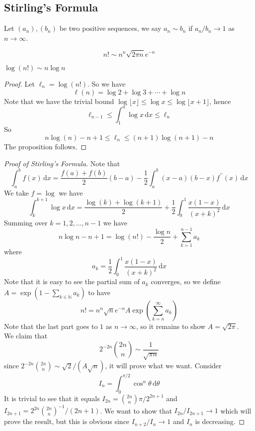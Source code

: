 \subsection{Stirling's Formula}
\begin{definition}
    Let $(a_n),(b_n)$ be two positive sequences, we say $a_n\sim b_n$ if $a_n/b_n\to 1$ as $n\to\infty$.
\end{definition}
\begin{theorem}[Stirling]
    $$n!\sim n^n\sqrt{2\pi n}e^{-n}$$
\end{theorem}
\begin{proposition}
    $\log(n!)\sim n\log n$
\end{proposition}
\begin{proof}
    Let $\ell_n=\log(n!)$.
    So we have
    $$\ell(n)=\log 2+\log 3+\cdots+\log n$$
    Note that we have the trivial bound $\log\lfloor x\rfloor\le \log x\le \log\lfloor x+1\rfloor$, hence
    $$\ell_{n-1}\le\int_1^n\log x\,\mathrm dx\le \ell_n$$
    So
    $$n\log(n)-n+1\le \ell_n\le (n+1)\log(n+1)-n$$
    The proposition follows.
\end{proof}
\begin{proof}[Proof of Stirling's Formula]
    Note that
    $$\int_a^bf(x)\,\mathrm dx=\frac{f(a)+f(b)}{2}(b-a)-\frac{1}{2}\int_a^b(x-a)(b-x)f^{\prime\prime}(x)\,\mathrm dx$$
    We take $f=\log$ we have
    $$\int_k^{k+1}\log x\,\mathrm dx=\frac{\log(k)+\log(k+1)}{2}+\frac{1}{2}\int_0^1\frac{x(1-x)}{(x+k)^2}\,\mathrm dx$$
    Summing over $k=1,2,\ldots,n-1$ we have
    $$n\log n-n+1=\log(n!)-\frac{\log n}{2}+\sum_{k=1}^{n-1}a_k$$
    where
    $$a_k=\frac{1}{2}\int_0^1\frac{x(1-x)}{(x+k)^2}\,\mathrm dx$$
    Note that it is easy to see the partial sum of $a_k$ converges, so we define $A=\exp(1-\sum_{k\in\mathbb N}a_k)$ to have
    $$n!=n^n\sqrt{n}e^{-n}A\exp\left(\sum_{k=n}^\infty a_k\right)$$
    Note that the last part goes to $1$ as $n\to\infty$, so it remains to show $A=\sqrt{2\pi}$.\\
    We claim that
    $$2^{-2n}\binom{2n}{n}\sim\frac{1}{\sqrt{\pi n}}$$
    since $2^{-2n}\binom{2n}{n}\sim\sqrt 2/(A\sqrt{n})$, it will prove what we want.
    Consider
    $$I_n=\int_0^{\pi/2}\cos^n\theta\,\mathrm d\theta$$
    It is trivial to see that it equals $I_{2n}=\binom{2n}{n}\pi/2^{2n+1}$ and $I_{2n+1}=2^{2n}\binom{2n}{n}^{-1}/(2n+1)$.
    We want to show that $I_{2n}/I_{2n+1}\to 1$ which will prove the result, but this is obvious since $I_{n+2}/I_n\to 1$ and $I_n$ is decreasing.
\end{proof}